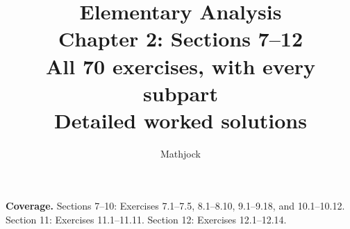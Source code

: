 
\title{\textbf{Elementary Analysis}\\[0.3em]
Chapter 2: Sections 7--12\\[0.4em]
\large All 70 exercises, with every subpart\\
Detailed worked solutions}
\author{Mathjock}
\date{}

\maketitle
\bookinfo
\par\textbf{Coverage.} Sections 7--10: Exercises 7.1--7.5, 8.1--8.10, 9.1--9.18, and 10.1--10.12. Section 11: Exercises 11.1--11.11. Section 12: Exercises 12.1--12.14.
\tableofcontents
\clearpage
\setcounter{section}{6}

\clearpage

\clearpage

\clearpage

\clearpage

\clearpage


